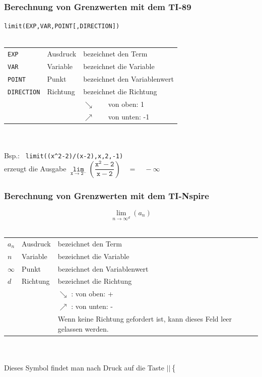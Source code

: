 \subsubsection{Berechnung von Grenzwerten mit dem TI-89}\label{subsubsec:limti}
\verb?limit(EXP,VAR,POINT[,DIRECTION])?\\\\
\begin{tabular}{@{}lll}
\verb|EXP|	& Ausdruck	& bezeichnet den Term \\
\verb|VAR|	& Variable	& bezeichnet die Variable \\
\verb|POINT|	& Punkt		& bezeichnet den Variablenwert \\
\verb|DIRECTION|& Richtung 	& bezeichnet die Richtung \\
		&		& $\searrow$~~~~von oben: 1 \\
		&		& $\nearrow$~~~~von unten: -1 \\
\end{tabular}\\\\
Bsp.: \verb| limit((x^2-2)/(x-2),x,2,-1)| \\
\indent\indent erzeugt die Ausgabe $\mathtt{ \lim\limits_{x \rightarrow 2^-} (\dfrac{x^2-2}{x-2}) \quad = \quad - \infty } $
\fi
\iftiboth
\newpage
\fi
\ifnspire
\subsubsection{Berechnung von Grenzwerten mit dem TI-Nspire}\label{subsubsec:limnspire}
\[ \lim\limits_{\boxed{n}\to\boxed{\infty}^{\boxed{d}}}(\boxed{a_n}) \]\\
\begin{tabular}{@{}llp{6cm}}
$\boxed{a_n}$    & Ausdruck & bezeichnet den Term \\
$\boxed{n}$      & Variable & bezeichnet die Variable \\
$\boxed{\infty}$ & Punkt    & bezeichnet den Variablenwert \\
$\boxed{d}$      & Richtung & bezeichnet die Richtung \\
                 &          & $\searrow$ : von oben: + \\
                 &          & $\nearrow$ : von unten: - \\
		 &          & Wenn keine Richtung gefordert ist, kann dieses Feld leer gelassen werden. 
\end{tabular}\\\\
Dieses Symbol findet man nach Druck auf die Taste $\boxed{\boxed{|\boxed{}|\left\{\frac{\boxed{}}{\boxed{}}\right.}}$
\fi

